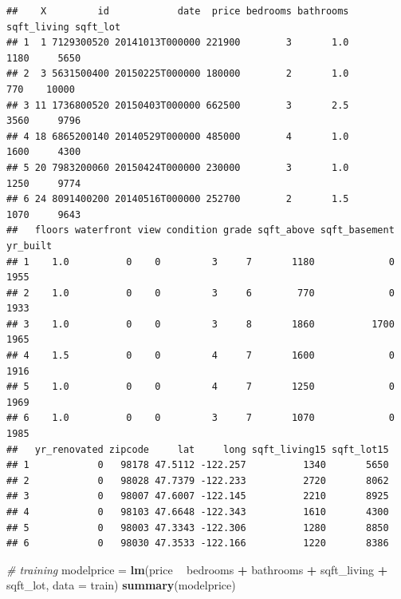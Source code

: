 \documentclass[
]{article}
\newenvironment{Shaded}{\begin{snugshade}}{\end{snugshade}}
\newcommand{\CommentTok}[1]{\textcolor[rgb]{0.56,0.35,0.01}{\textit{#1}}}
\newcommand{\DataTypeTok}[1]{\textcolor[rgb]{0.13,0.29,0.53}{#1}}
\newcommand{\KeywordTok}[1]{\textcolor[rgb]{0.13,0.29,0.53}{\textbf{#1}}}
\newcommand{\NormalTok}[1]{#1}
\newcommand{\OperatorTok}[1]{\textcolor[rgb]{0.81,0.36,0.00}{\textbf{#1}}}
\newcommand{\StringTok}[1]{\textcolor[rgb]{0.31,0.60,0.02}{#1}}
\begin{document}
\begin{verbatim}
##    X         id            date  price bedrooms bathrooms sqft_living sqft_lot
## 1  1 7129300520 20141013T000000 221900        3       1.0        1180     5650
## 2  3 5631500400 20150225T000000 180000        2       1.0         770    10000
## 3 11 1736800520 20150403T000000 662500        3       2.5        3560     9796
## 4 18 6865200140 20140529T000000 485000        4       1.0        1600     4300
## 5 20 7983200060 20150424T000000 230000        3       1.0        1250     9774
## 6 24 8091400200 20140516T000000 252700        2       1.5        1070     9643
##   floors waterfront view condition grade sqft_above sqft_basement yr_built
## 1    1.0          0    0         3     7       1180             0     1955
## 2    1.0          0    0         3     6        770             0     1933
## 3    1.0          0    0         3     8       1860          1700     1965
## 4    1.5          0    0         4     7       1600             0     1916
## 5    1.0          0    0         4     7       1250             0     1969
## 6    1.0          0    0         3     7       1070             0     1985
##   yr_renovated zipcode     lat     long sqft_living15 sqft_lot15
## 1            0   98178 47.5112 -122.257          1340       5650
## 2            0   98028 47.7379 -122.233          2720       8062
## 3            0   98007 47.6007 -122.145          2210       8925
## 4            0   98103 47.6648 -122.343          1610       4300
## 5            0   98003 47.3343 -122.306          1280       8850
## 6            0   98030 47.3533 -122.166          1220       8386
\end{verbatim}

\begin{Shaded}
\begin{Highlighting}[]
\CommentTok{# training}
\NormalTok{modelprice =}\StringTok{ }\KeywordTok{lm}\NormalTok{(price }\OperatorTok{~}\StringTok{ }\NormalTok{bedrooms }\OperatorTok{+}\StringTok{ }\NormalTok{bathrooms }\OperatorTok{+}\StringTok{ }\NormalTok{sqft_living }\OperatorTok{+}\StringTok{ }\NormalTok{sqft_lot, }\DataTypeTok{data =}\NormalTok{ train)}
\KeywordTok{summary}\NormalTok{(modelprice)}
\end{Highlighting}
\end{Shaded}
\end{document}
